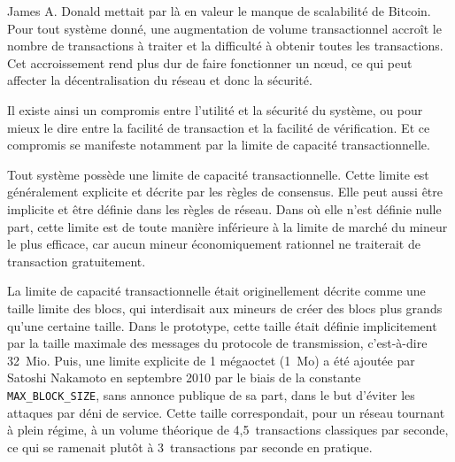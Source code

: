 James A. Donald mettait par là en valeur le manque de scalabilité de Bitcoin. Pour tout système donné, une augmentation de volume transactionnel accroît le nombre de transactions à traiter et la difficulté à obtenir toutes les transactions. Cet accroissement rend plus dur de faire fonctionner un nœud, ce qui peut affecter la décentralisation du réseau et donc la sécurité.

Il existe ainsi un compromis entre l'utilité et la sécurité du système, ou pour mieux le dire entre la facilité de transaction et la facilité de vérification. Et ce compromis se manifeste notamment par la limite de capacité transactionnelle.

Tout système possède une limite de capacité transactionnelle. Cette limite est généralement explicite et décrite par les règles de consensus. Elle peut aussi être implicite et être définie dans les règles de réseau. Dans où elle n'est définie nulle part, cette limite est de toute manière inférieure à la limite de marché du mineur le plus efficace, car aucun mineur économiquement rationnel ne traiterait de transaction gratuitement.

La limite de capacité transactionnelle était originellement décrite comme une taille limite des blocs, qui interdisait aux mineurs de créer des blocs plus grands qu'une certaine taille. Dans le prototype, cette taille était définie implicitement par la taille maximale des messages du protocole de transmission, c'est-à-dire 32~Mio. Puis, une limite explicite de 1 mégaoctet (1~Mo) a été ajoutée par Satoshi Nakamoto en septembre 2010 par le biais de la constante \texttt{MAX\_BLOCK\_SIZE}, sans annonce publique de sa part, dans le but d'éviter les attaques par déni de service. Cette taille correspondait, pour un réseau tournant à plein régime, à un volume théorique de 4,5~transactions classiques par seconde, ce qui se ramenait plutôt à 3~transactions par seconde en pratique. %

